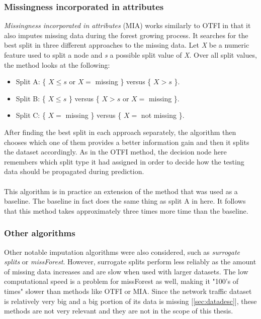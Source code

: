 \documentclass[11pt]{article}
\begin{document}
      \subsubsection{Missingness incorporated in attributes}
        \label{sec:mia}
        {\it Missingness incorporated in attributes}\cite{mia} (MIA) works similarly to OTFI in that it also imputes missing data during the forest growing process. It searches for the best split in three different approaches to the missing data. Let {\it X} be a numeric feature used to split a node and {\it s} a possible split value of {\it X}. Over all split values, the method looks at the following:
        \begin{itemize}
        \item Split A: \{ $X \leq s$ or $X =$ missing \} versus \{ $X > s$ \}.
        \item Split B: \{ $X \leq s$ \} versus \{ $X > s$ or $X =$ missing \}.
        \item Split C: \{ $X =$ missing \} versus \{ $X =$ not missing \}.
        \end{itemize}
        After finding the best split in each approach separately, the algorithm then chooses which one of them provides a better information gain and then it splits the dataset accordingly. As in the OTFI method, the decision node here remembers which split type it had assigned in order to decide how the testing data should be propagated during prediction.
        \\~\\
        This algorithm is in practice an extension of the method that was used as a baseline. The baseline in fact does the same thing as split A in here. It follows that this method takes approximately three times more time than the baseline.
      \subsubsection{Other algorithms}
        Other notable imputation algorithms were also considered, such as {\it surrogate splits}\cite{splits} or {\it missForest}\cite{otfi}. However, surrogate splits perform less reliably as the amount of missing data increases\cite{splits} and are slow when used with larger datasets.\cite{rsf} The low computational speed is a problem for missForest as well, making it "100's of times" slower than methods like OTFI or MIA.\cite{otfi} Since the network traffic dataset is relatively very big and a big portion of its data is missing [\ref{sec:datadesc}], these methods are not very relevant and they are not in the scope of this thesis.
  \newpage
\end{document}
